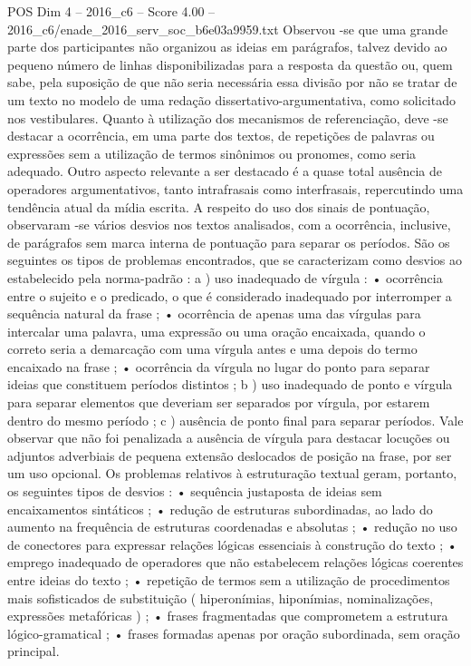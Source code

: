 \begin{textsample}{POS Dim 4 – 2016\_c6 – Score 4.00 – 2016\_c6/enade\_2016\_serv\_soc\_b6e03a9959.txt}
Observou -se que uma grande parte dos participantes não organizou as ideias em parágrafos, talvez devido ao pequeno número de linhas disponibilizadas para a resposta da questão ou, quem sabe, pela suposição de que não seria necessária essa divisão por não se tratar de um texto no modelo de uma redação dissertativo-argumentativa, como solicitado nos vestibulares.
Quanto à utilização dos mecanismos de referenciação, deve -se destacar a ocorrência, em uma parte dos textos, de repetições de palavras ou expressões sem a utilização de termos sinônimos ou pronomes, como seria adequado.
Outro aspecto relevante a ser destacado é a quase total ausência de operadores argumentativos, tanto intrafrasais como interfrasais, repercutindo uma tendência atual da mídia escrita.
A respeito do uso dos sinais de pontuação, observaram -se vários desvios nos textos analisados, com a ocorrência, inclusive, de parágrafos sem marca interna de pontuação para separar os períodos.
São os seguintes os tipos de problemas encontrados, que se caracterizam como desvios ao estabelecido pela norma-padrão : a ) uso inadequado de vírgula : • ocorrência entre o sujeito e o predicado, o que é considerado inadequado por interromper a sequência natural da frase ; • ocorrência de apenas uma das vírgulas para intercalar uma palavra, uma expressão ou uma oração encaixada, quando o correto seria a demarcação com uma vírgula antes e uma depois do termo encaixado na frase ; • ocorrência da vírgula no lugar do ponto para separar ideias que constituem períodos distintos ; b ) uso inadequado de ponto e vírgula para separar elementos que deveriam ser separados por vírgula, por estarem dentro do mesmo período ; c ) ausência de ponto final para separar períodos.
Vale observar que não foi penalizada a ausência de vírgula para destacar locuções ou adjuntos adverbiais de pequena extensão deslocados de posição na frase, por ser um uso opcional.
Os problemas relativos à estruturação textual geram, portanto, os seguintes tipos de desvios : • sequência justaposta de ideias sem encaixamentos sintáticos ; • redução de estruturas subordinadas, ao lado do aumento na frequência de estruturas coordenadas e absolutas ; • redução no uso de conectores para expressar relações lógicas essenciais à construção do texto ; • emprego inadequado de operadores que não estabelecem relações lógicas coerentes entre ideias do texto ; • repetição de termos sem a utilização de procedimentos mais sofisticados de substituição ( hiperonímias, hiponímias, nominalizações, expressões metafóricas ) ; • frases fragmentadas que comprometem a estrutura lógico-gramatical ; • frases formadas apenas por oração subordinada, sem oração principal.

\end{textsample}
